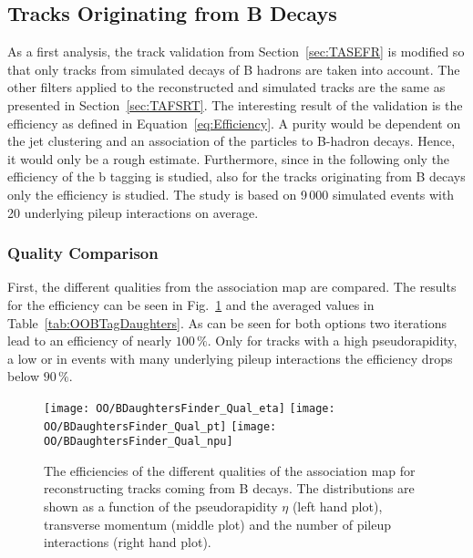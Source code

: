 \subsection{Tracks Originating from B Decays \label{sec:OOBTagDaughters}}

As a first analysis, the track validation from Section~\ref{sec:TASEFR} is modified so that only tracks from simulated decays of B hadrons are taken into account. The other filters applied to the reconstructed and simulated tracks are the same as presented in Section~\ref{sec:TAFSRT}. The interesting result of the validation is the efficiency as defined in Equation~\ref{eq:Efficiency}. A purity would be dependent on the jet clustering and an association of the particles to B-hadron decays. Hence, it would only be a rough estimate. Furthermore, since in the following only the efficiency of the b tagging is studied, also for the tracks originating from B decays only the efficiency is studied. The study is based on 9\,000 simulated \ttbar events with 20 underlying pileup interactions on average.

\subsubsection{Quality Comparison \label{sec:OOBTagDaughtersQual}}

First, the different qualities from the association map are compared. The results for the efficiency can be seen in Fig.~\ref{plot:OOBTagDaughtersQual} and the averaged values in Table~\ref{tab:OOBTagDaughters}. As can be seen for both options two iterations lead to an efficiency of nearly $100\,\%$. Only for tracks with a high pseudorapidity, a low \pt or in events with many underlying pileup interactions the efficiency drops below $90\,\%$. 

\begin{figure}[h!t]
  \centering
  \texttt{[image: OO/BDaughtersFinder\_Qual\_eta]}
  \texttt{[image: OO/BDaughtersFinder\_Qual\_pt]}
  \texttt{[image: OO/BDaughtersFinder\_Qual\_npu]}
  \caption[Efficiencies of the different qualities of the association map for reconstructing tracks from B decays]{The efficiencies of the different qualities of the association map for reconstructing tracks coming from B decays. The distributions are shown as a function of the pseudorapidity $\eta$ (left hand plot), transverse momentum (middle plot) and the number of pileup interactions (right hand plot). \label{plot:OOBTagDaughtersQual}}
\end{figure}

